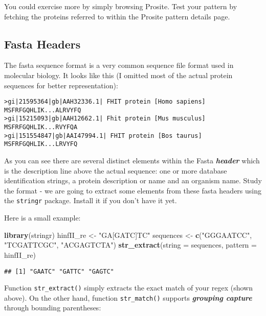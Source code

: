 \documentclass[]{book}
\newenvironment{Shaded}{\begin{snugshade}}{\end{snugshade}}
\newcommand{\DataTypeTok}[1]{\textcolor[rgb]{0.13,0.29,0.53}{#1}}
\newcommand{\KeywordTok}[1]{\textcolor[rgb]{0.13,0.29,0.53}{\textbf{#1}}}
\newcommand{\NormalTok}[1]{#1}
\newcommand{\StringTok}[1]{\textcolor[rgb]{0.31,0.60,0.02}{#1}}
\begin{document}
You could exercise more by simply browsing Prosite. Test your pattern by fetching the proteins referred to within the Prosite pattern details page.

\hypertarget{fasta-headers}{%
\subsection{Fasta Headers}\label{fasta-headers}}

The fasta sequence format is a very common sequence file format used in molecular biology.
It looks like this (I omitted most of the actual protein sequences for better representation):

\begin{verbatim}
>gi|21595364|gb|AAH32336.1| FHIT protein [Homo sapiens]
MSFRFGQHLIK...ALRVYFQ
>gi|15215093|gb|AAH12662.1| Fhit protein [Mus musculus]
MSFRFGQHLIK...RVYFQA
>gi|151554847|gb|AAI47994.1| FHIT protein [Bos taurus]
MSFRFGQHLIK...LRVYFQ
\end{verbatim}

As you can see there are several distinct elements within the Fasta \textbf{\emph{header}} which is the description line above the actual sequence: one or more database identification strings, a protein description or name and an organism name. Study the format - we are going to extract some elements from these fasta headers using the \texttt{stringr} package. Install it if you don't have it yet.

Here is a small example:

\begin{Shaded}
\begin{Highlighting}[]
\KeywordTok{library}\NormalTok{(stringr)}
\NormalTok{hinfII_re <-}\StringTok{ "GA[GATC]TC"}
\NormalTok{sequences <-}\StringTok{ }\KeywordTok{c}\NormalTok{(}\StringTok{"GGGAATCC"}\NormalTok{, }\StringTok{"TCGATTCGC"}\NormalTok{, }\StringTok{"ACGAGTCTA"}\NormalTok{)}
\KeywordTok{str_extract}\NormalTok{(}\DataTypeTok{string =}\NormalTok{ sequences,}
            \DataTypeTok{pattern =}\NormalTok{ hinfII_re)}
\end{Highlighting}
\end{Shaded}

\begin{verbatim}
## [1] "GAATC" "GATTC" "GAGTC"
\end{verbatim}

Function \texttt{str\_extract()} simply extracts the exact match of your regex (shown above). On the other hand, function \texttt{str\_match()} supports \textbf{\emph{grouping capture}} through bounding parentheses:
\end{document}

